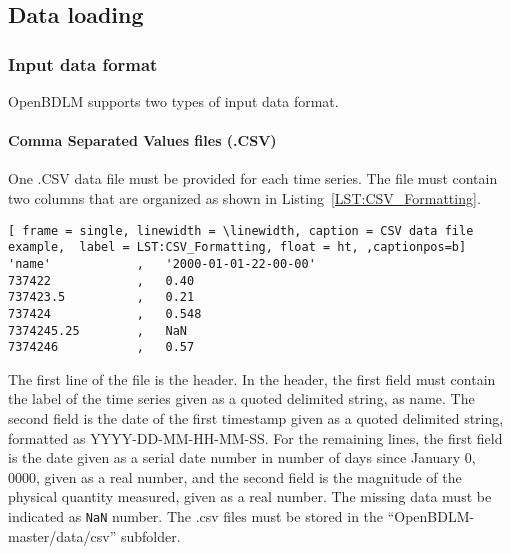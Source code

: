 \subsection{Data loading}
\label{S:DATALOADING}
\subsubsection{Input data format}

OpenBDLM supports two types of input data format.


\paragraph{Comma Separated Values files (.CSV)}
\label{SS:CSVInput}

One .CSV data file must be provided for each time series.
The file must contain two columns that are organized as shown in Listing~\ref{LST:CSV_Formatting}.
\begin{lstlisting}[ frame = single, linewidth = \linewidth, caption = CSV data file example,  label = LST:CSV_Formatting, float = ht, ,captionpos=b]
'name'            ,   '2000-01-01-22-00-00'
737422            ,   0.40
737423.5          ,   0.21
737424            ,   0.548
7374245.25        ,   NaN
7374246           ,   0.57
\end{lstlisting}    
The first line of the file is the header.
In the header, the first field must contain the label of the time series given as a quoted delimited string, as \textquotesingle name\textquotesingle .
The second field is the date of the first timestamp given as a quoted delimited string, formatted as \textquotesingle YYYY-DD-MM-HH-MM-SS\textquotesingle.  
For the remaining lines, the first field is the date given as a serial date number in number of days since January 0, 0000, given as a real number, and the second field is the magnitude of the physical quantity measured, given as a real number.
The missing data must be indicated as \lstinline[basicstyle = \mlttfamily \small ]!NaN! number.
The .csv files must be stored in the ``OpenBDLM-master/data/csv'' subfolder.

